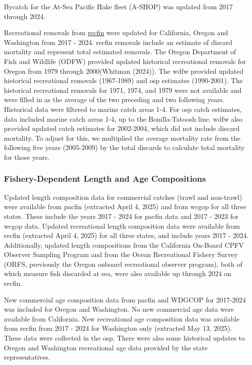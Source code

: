 \documentclass[
]{scrartcl}
\begin{document}
Bycatch for the At-Sea Pacific Hake fleet (A-SHOP) was updated from 2017
through 2024.

Recreational removals from \href{www.recfin.org}{\gls{recfin}} were
updated for California, Oregon and Washington from 2017 - 2024.
\gls{recfin} removals include an estimate of discard mortality and
represent total estimated removals. The Oregon Department of Fish and
Wildlife (ODFW) provided updated historical recreational removals for
Oregon from 1979 through 2000(Whitman (2024)). The \gls{wdfw} provided
updated historical recreational removals (1967-1989) and \gls{osp}
estimates (1990-2001). The historical recreational removals for 1971,
1974, and 1979 were not available and were filled in as the average of
the two preceding and two following years. Historical data were filtered
to marine catch areas 1-4. For \gls{osp} catch estimates, data included
marine catch areas 1-4, up to the Bonilla-Tatoosh line. \gls{wdfw} also
provided updated catch estimates for 2002-2004, which did not include
discard mortality. To adjust for this, we multiplied the average
mortality rate from the following five years (2005-2009) by the total
discards to calculate total mortality for those years.

\subsubsection{Fishery-Dependent Length and Age
Compositions}\label{sec-fd_comps}

Updated length composition data for commercial catches (trawl and
non-trawl) were available from \gls{pacfin} (extracted April 4, 2025)
and from \gls{wcgop} for all three states. These include the years 2017
- 2024 for \gls{pacfin} data and 2017 - 2023 for \gls{wcgop} data.
Updated recreational length composition data were available from
\gls{recfin} (extracted April 4, 2025) for all three states, and include
years 2017 - 2024. Additionally, updated length compositions from the
California On-Board CPFV Observer Sampling Program and from the Ocean
Recreational Fishery Survey (ORFS, previously the Oregon onboard
recreational observer program), both of which measure fish discarded at
sea, were also available up through 2024 on \gls{recfin}.

New commercial age composition data from \gls{pacfin} and WDGCOP for
2017-2024 was included for Oregon and Washington. No new commercial age
data were available from California. New recreational age composition
data was available from \gls{recfin} from 2017 - 2024 for Washington
only (extracted May 13, 2025). These data were collected in the
\gls{osp}. There were also some historical updates to Oregon and
Washington recreational age data provided by the state representatives.
\end{document}
